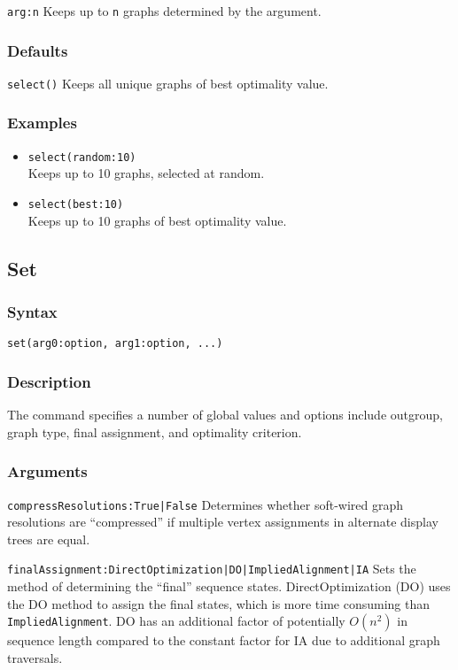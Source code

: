 \documentclass[11pt]{article}
\begin{document}
			\smallskip		
			\noindent \texttt{arg:n} Keeps up to \texttt{n} graphs determined by the argument.
		\subsubsection{Defaults}
			\texttt{select()} Keeps all unique graphs of best optimality value.
		\subsubsection{Examples}
				\begin{itemize}
					\item{\texttt{select(random:10)}\\ Keeps up to 10 graphs, selected at random.}
					\item{\texttt{select(best:10)}\\ Keeps up to 10 graphs of best optimality value.}
				\end{itemize}
			
	\subsection{Set}
		\subsubsection{Syntax}
				\texttt{set(arg0:option, arg1:option, ...)}
		\subsubsection{Description}
		The command specifies a number of global values and options include outgroup, graph type, final assignment, and optimality criterion.
		\subsubsection{Arguments}
			\smallskip
			\noindent \texttt{compressResolutions:True|False} Determines whether soft-wired graph resolutions are ``compressed''
			if multiple vertex assignments in alternate display trees are equal.
			
			\smallskip
			\noindent \texttt{finalAssignment:DirectOptimization|DO|ImpliedAlignment|IA} Sets the method of determining the ``final''
			sequence states. DirectOptimization (DO) uses the DO method to assign the final states, which is more time consuming 
			than \texttt{ImpliedAlignment}. DO has an additional factor of potentially $O(n^2)$ in sequence length compared to the constant factor for IA due to additional graph traversals.
			
\end{document}
